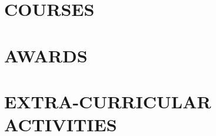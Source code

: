 \documentclass[margin, 10pt]{res} %
\begin{document}
\begin{resume}
\vspace{-0.3em}
\section{COURSES}




\section{AWARDS}



\vspace{-0.3em}
\section{EXTRA-CURRICULAR \\ ACTIVITIES}


\end{resume}
\end{document}
